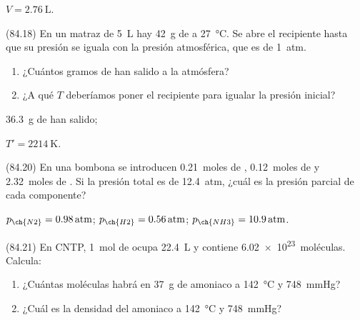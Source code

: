       \begin{solution}
        \( V = \SI{2.76}{\liter}\).
      \end{solution}




      \begin{exercise}[
          tags    = {},
          topics  = {química,química básica},
          source  = {FQ 1B MGH 2016, p84, e18},
        ]
        (84.18) En un matraz de \SI{5}{\liter} hay \SI{42}{\gram} de  a \SI{27}{\celsius}. Se abre el recipiente hasta que su presión se iguala con la presión atmosférica, que es de \SI{1}{atm}.
        \begin{enumerate}
          \item ¿Cuántos gramos de  han salido a la atmósfera?
          \item ¿A qué \( T \) deberíamos poner el recipiente para igualar la presión inicial?
        \end{enumerate}
      \end{exercise}

      \begin{solution}
        \begin{enumerate*}
          \item \SI{36.3}{\gram} de  han salido;
          \item \( T' = \SI{2214}{\kelvin} \).
        \end{enumerate*}
      \end{solution}




      \begin{exercise}[
          tags    = {},
          topics  = {química,química básica},
          source  = {FQ 1B MGH 2016, p84, e20},
        ]
        (84.20) En una bombona se introducen \SI{0.21}{moles} de , \SI{0.12}{moles}
        de  y \SI{2.32}{moles} de . Si la presión total es de \SI{12.4}{atm}, ¿cuál es la presión parcial de cada componente?
      \end{exercise}

      \begin{solution}
        \( p_{\ch{N2}} = \SI{0.98}{atm} \); \( p_{\ch{H2}} = \SI{0.56}{atm} \); \( p_{\ch{NH3}} = \SI{10.9}{atm} \).
      \end{solution}




      \begin{exercise}[
          tags    = {},
          topics  = {química,química básica},
          source  = {FQ 1B MGH 2016, p84, e21},
        ]
        (84.21) En CNTP, \SI{1}{mol} de  ocupa \SI{22.4}{\liter} y contiene \SI{6.02e23}{moléculas}. Calcula:
        \begin{enumerate}
          \item ¿Cuántas moléculas habrá en \SI{37}{\gram} de amoniaco a \SI{142}{\celsius} y \SI{748}{\mmHg}?
          \item ¿Cuál es la densidad del amoniaco a \SI{142}{\celsius} y \SI{748}{\mmHg}?
        \end{enumerate}
      \end{exercise}

